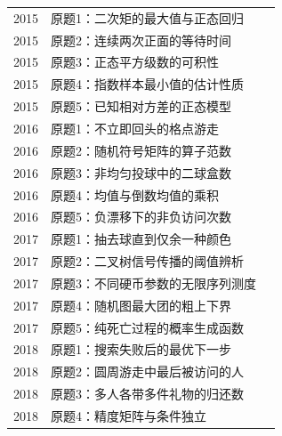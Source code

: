 \documentclass[UTF8,12pt,a4paper,fontset=fandol]{ctexbook}
\begin{document}
\begin{longtable}{@{}p{12mm}p{81mm}r@{}}
2015 & 原题1：二次矩的最大值与正态回归 & \pageref{yau:2015-1}\\

2015 & 原题2：连续两次正面的等待时间 & \pageref{yau:2015-2}\\

2015 & 原题3：正态平方级数的可积性 & \pageref{yau:2015-3}\\

2015 & 原题4：指数样本最小值的估计性质 & \pageref{yau:2015-4}\\

2015 & 原题5：已知相对方差的正态模型 & \pageref{yau:2015-5}\\

2016 & 原题1：不立即回头的格点游走 & \pageref{yau:2016-1}\\

2016 & 原题2：随机符号矩阵的算子范数 & \pageref{yau:2016-2}\\

2016 & 原题3：非均匀投球中的二球盒数 & \pageref{yau:2016-3}\\

2016 & 原题4：均值与倒数均值的乘积 & \pageref{yau:2016-4}\\

2016 & 原题5：负漂移下的非负访问次数 & \pageref{yau:2016-5}\\

2017 & 原题1：抽去球直到仅余一种颜色 & \pageref{yau:2017-1}\\

2017 & 原题2：二叉树信号传播的阈值辨析 & \pageref{yau:2017-2}\\

2017 & 原题3：不同硬币参数的无限序列测度 & \pageref{yau:2017-3}\\

2017 & 原题4：随机图最大团的粗上下界 & \pageref{yau:2017-4}\\

2017 & 原题5：纯死亡过程的概率生成函数 & \pageref{yau:2017-5}\\

2018 & 原题1：搜索失败后的最优下一步 & \pageref{yau:2018-1}\\

2018 & 原题2：圆周游走中最后被访问的人 & \pageref{yau:2018-2}\\

2018 & 原题3：多人各带多件礼物的归还数 & \pageref{yau:2018-3}\\

2018 & 原题4：精度矩阵与条件独立 & \pageref{yau:2018-4}\\


\end{longtable}
\end{document}
